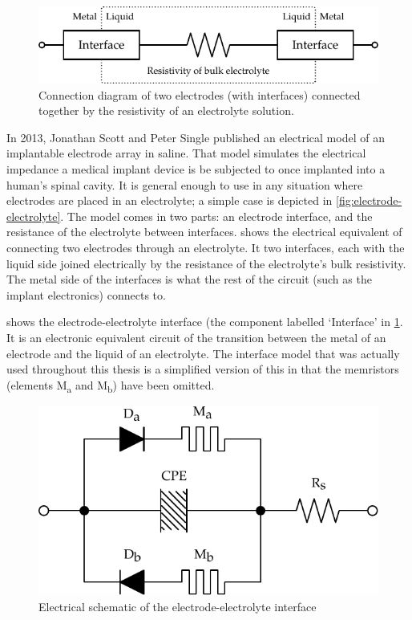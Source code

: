   \begin{figure}
    \centering
    \includegraphics{content/pt2/07-InterfaceModel/graphics/simpleElectrodeElectrolyteModel}
    \caption{\label{fig:pt2-simpleElectrodeElectrolyteModel}Connection diagram of two electrodes (with interfaces) connected together by the resistivity of an electrolyte solution.}
  \end{figure}
  In 2013, Jonathan Scott and Peter Single published an electrical model of an implantable electrode array in saline\cite{ScottSingle2013}.
  That model simulates the electrical impedance a medical implant device is be subjected to once implanted into a human's spinal cavity.
  It is general enough to use in any situation where electrodes are placed in an electrolyte; a simple case is depicted in \cref{fig:electrode-electrolyte}.
  The model comes in two parts: an electrode interface, and the resistance of the electrolyte between interfaces.
   shows the electrical equivalent of connecting two electrodes through an electrolyte.
  It two interfaces, each with the liquid side joined electrically by the resistance of the electrolyte's bulk resistivity.
  The metal side of the interfaces is what the rest of the circuit (such as the implant electronics) connects to.

   shows the electrode-electrolyte interface (the component labelled `Interface' in \cref{fig:pt2-simpleElectrodeElectrolyteModel}.
  It is an electronic equivalent circuit of the transition between the metal of an electrode and the liquid of an electrolyte.
  The interface model that was actually used throughout this thesis is a simplified version of this in that the memristors (elements M\textsubscript{a} and M\textsubscript{b}) have been omitted.
  \begin{figure}
    \centering
    \includegraphics{content/pt2/07-InterfaceModel/graphics/interfaceSchematic}
    \caption{\label{fig:pt2-interfaceSchematic}Electrical schematic of the electrode-electrolyte interface}
  \end{figure}


